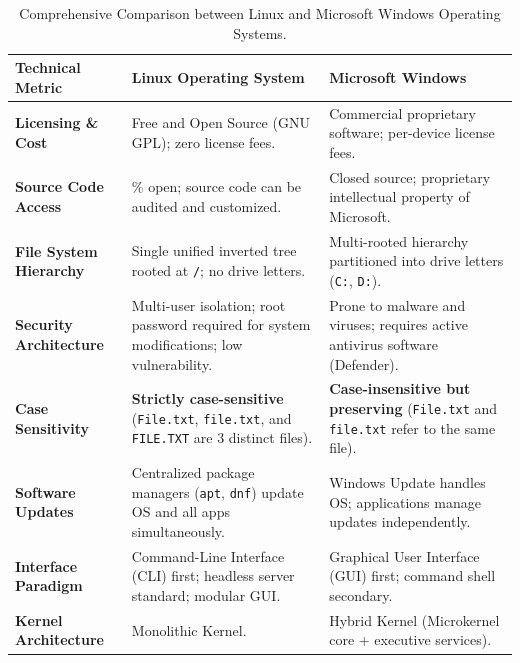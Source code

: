 \begin{table}[htbp]
\centering
\small
\renewcommand{\arraystretch}{1.3}
\begin{tabularx}{\linewidth}{l>{\raggedright\arraybackslash}X>{\raggedright\arraybackslash}X}
\toprule
\textbf{Technical Metric} & \textbf{Linux Operating System} & \textbf{Microsoft Windows} \\
\midrule
\textbf{Licensing \& Cost} & Free and Open Source (GNU GPL); zero license fees. & Commercial proprietary software; per-device license fees. \\
\textbf{Source Code Access} & 100\% open; source code can be audited and customized. & Closed source; proprietary intellectual property of Microsoft. \\
\textbf{File System Hierarchy} & Single unified inverted tree rooted at \texttt{/}; no drive letters. & Multi-rooted hierarchy partitioned into drive letters (\texttt{C:}, \texttt{D:}). \\
\textbf{Security Architecture} & Multi-user isolation; root password required for system modifications; low vulnerability. & Prone to malware and viruses; requires active antivirus software (Defender). \\
\textbf{Case Sensitivity} & \textbf{Strictly case-sensitive} (\texttt{File.txt}, \texttt{file.txt}, and \texttt{FILE.TXT} are 3 distinct files). & \textbf{Case-insensitive but preserving} (\texttt{File.txt} and \texttt{file.txt} refer to the same file). \\
\textbf{Software Updates} & Centralized package managers (\texttt{apt}, \texttt{dnf}) update OS and all apps simultaneously. & Windows Update handles OS; applications manage updates independently. \\
\textbf{Interface Paradigm} & Command-Line Interface (CLI) first; headless server standard; modular GUI. & Graphical User Interface (GUI) first; command shell secondary. \\
\textbf{Kernel Architecture} & Monolithic Kernel. & Hybrid Kernel (Microkernel core + executive services). \\
\bottomrule
\end{tabularx}
\caption{Comprehensive Comparison between Linux and Microsoft Windows Operating Systems.}
\label{tab:windows-vs-linux}
\end{table}


